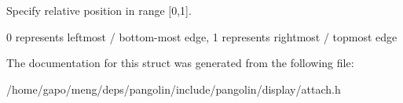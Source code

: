 Specify relative position in range \mbox{[}0,1\mbox{]}. 

0 represents leftmost / bottom-\/most edge, 1 represents rightmost / topmost edge 

The documentation for this struct was generated from the following file\+:\begin{DoxyCompactItemize}
\item 
/home/gapo/meng/deps/pangolin/include/pangolin/display/attach.\+h\end{DoxyCompactItemize}
